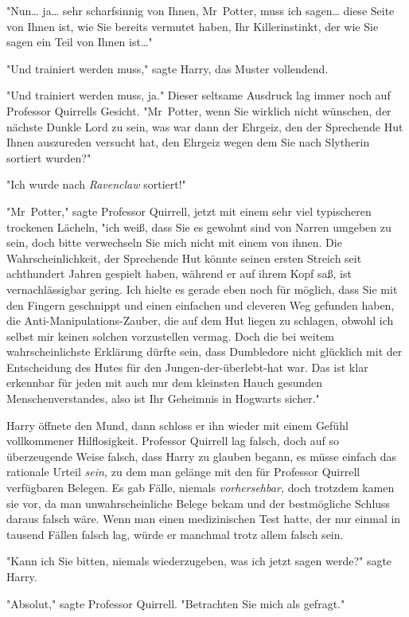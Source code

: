 {"Nun… ja… sehr scharfsinnig von Ihnen, Mr~Potter, muss ich sagen… diese Seite von Ihnen ist, wie Sie bereits vermutet haben, Ihr Killerinstinkt, der wie Sie sagen ein Teil von Ihnen ist…"

"Und trainiert werden muss," sagte Harry, das Muster vollendend.

"Und trainiert werden muss, ja." Dieser seltsame Ausdruck lag immer noch auf Professor Quirrells Gesicht. "Mr~Potter, wenn Sie wirklich nicht wünschen, der nächste Dunkle Lord zu sein, was war dann der Ehrgeiz, den der Sprechende Hut Ihnen auszureden versucht hat, den Ehrgeiz wegen dem Sie nach Slytherin sortiert wurden?"

"Ich wurde nach \emph{Ravenclaw} sortiert!"

"Mr~Potter," sagte Professor Quirrell, jetzt mit einem sehr viel typischeren trockenen Lächeln, "ich weiß, dass Sie es gewohnt sind von Narren umgeben zu sein, doch bitte verwechseln Sie mich nicht mit einem von ihnen. Die Wahrscheinlichkeit, der Sprechende Hut könnte seinen ersten Streich seit achthundert Jahren gespielt haben, während er auf ihrem Kopf saß, ist vernachlässigbar gering. Ich hielte es gerade eben noch für möglich, dass Sie mit den Fingern geschnippt und einen einfachen und cleveren Weg gefunden haben, die Anti-Manipulations-Zauber, die auf dem Hut liegen zu schlagen, obwohl ich selbst mir keinen solchen vorzustellen vermag. Doch die bei weitem wahrscheinlichste Erklärung dürfte sein, dass Dumbledore nicht glücklich mit der Entscheidung des Hutes für den Jungen-der-überlebt-hat war. Das ist klar erkennbar für jeden mit auch nur dem kleinsten Hauch gesunden Menschenverstandes, also ist Ihr Geheimnis in Hogwarts sicher."

Harry öffnete den Mund, dann schloss er ihn wieder mit einem Gefühl vollkommener Hilflosigkeit. Professor Quirrell lag falsch, doch auf so überzeugende Weise falsch, dass Harry zu glauben begann, es müsse einfach das rationale Urteil \emph{sein,} zu dem man gelänge mit den für Professor Quirrell verfügbaren Belegen. Es gab Fälle, niemals \emph{vorhersehbar,} doch trotzdem kamen sie vor, da man unwahrscheinliche Belege bekam und der bestmögliche Schluss daraus falsch wäre. Wenn man einen medizinischen Test hatte, der nur einmal in tausend Fällen falsch lag, würde er manchmal trotz allem falsch sein.

"Kann ich Sie bitten, niemals wiederzugeben, was ich jetzt sagen werde?" sagte Harry.

"Absolut," sagte Professor Quirrell. "Betrachten Sie mich als gefragt."

}

